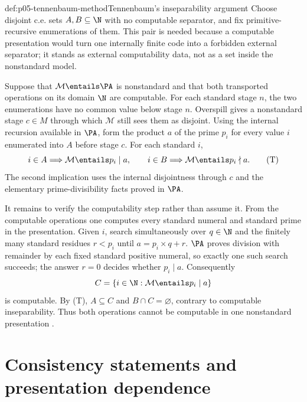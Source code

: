 \begin{hbmethod}{def:p05-tennenbaum-method}{Tennenbaum's inseparability argument}
Choose disjoint c.e. sets \(A,B\subseteq\N\) with no computable separator, and
fix primitive-recursive enumerations of them.  This pair is needed because a
computable presentation would turn one internally finite code into a forbidden
external separator; it stands as external computability data, not as a set
inside the nonstandard model.

Suppose that \(\mathcal M\entails\PA\) is nonstandard and that both transported
operations on its domain \(\N\) are computable.  For each standard stage \(n\),
the two enumerations have no common value below stage \(n\).  Overspill gives a
nonstandard stage \(c\in M\) through which \(\mathcal M\) still sees them as
disjoint.  Using the internal recursion available in \(\PA\), form the product
\(a\) of the prime \(p_i\) for every value \(i\) enumerated into \(A\) before
stage \(c\).  For each standard \(i\),
\[
 i\in A\Longrightarrow \mathcal M\entails p_i\mid a,
 \qquad
 i\in B\Longrightarrow \mathcal M\entails p_i\nmid a.                 \tag{T}
\]
The second implication uses the internal disjointness through \(c\) and the
elementary prime-divisibility facts proved in \(\PA\).

It remains to verify the computability step rather than assume it.  From the
computable operations one computes every standard numeral and standard prime
in the presentation.  Given \(i\), search simultaneously over \(q\in\N\) and
the finitely many standard residues \(r<p_i\) until
\(a=p_i\times q+r\).  \(\PA\) proves division with remainder by each fixed
standard positive numeral, so exactly one such search succeeds; the answer
\(r=0\) decides whether \(p_i\mid a\).  Consequently
\[
 C=\{i\in\N:\mathcal M\entails p_i\mid a\}
\]
is computable.  By (T), \(A\subseteq C\) and \(B\cap C=\varnothing\), contrary
to computable inseparability.  Thus both operations cannot be computable in
one nonstandard presentation \cite{Tennenbaum1959,Kaye1991}.
\end{hbmethod}

\section{Consistency statements and presentation dependence}

